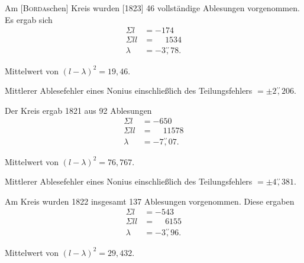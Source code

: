 \par\bigskip
\par\noindent\hspace*{\parindent}Am [\textsc{Borda}schen] Kreis wurden [1823] 46 vollständige Ablesungen vorgenommen. Es ergab sich
\[
\begin{aligned}
\Sigma l&=-174\\
\Sigma ll&=\phantom{-}1534\\
\lambda&=-3\overset{\prime\prime}{,}78.
\end{aligned}
\]
\par\noindent\hspace*{\parindent}Mittelwert von $(l-\lambda)^2=19{,}46$.
\par\noindent\hspace*{\parindent}Mittlerer Ablesefehler eines Nonius einschließlich des Teilungsfehlers $=\pm2\overset{\prime\prime}{,}206$.
\par\noindent\hspace*{\parindent}Der Kreis ergab 1821 aus 92 Ablesungen
\[
\begin{aligned}
\Sigma l&=-650\\
\Sigma ll&=\phantom{-}11578\\
\lambda&=-7\overset{\prime\prime}{,}07.
\end{aligned}
\]
\par\noindent\hspace*{\parindent}Mittelwert von $(l-\lambda)^2=76{,}767$.
\par\noindent\hspace*{\parindent}Mittlerer Ablesefehler eines Nonius einschließlich des Teilungsfehlers $=\pm4\overset{\prime\prime}{,}381$.
\par\noindent\hspace*{\parindent}Am Kreis wurden 1822 insgesamt 137 Ablesungen vorgenommen. Diese ergaben
\[
\begin{aligned}
\Sigma l&=-543\\
\Sigma ll&=\phantom{-}6155\\
\lambda&=-3\overset{\prime\prime}{,}96.
\end{aligned}
\]
\par\noindent\hspace*{\parindent}Mittelwert von $(l-\lambda)^2=29{,}432$.

